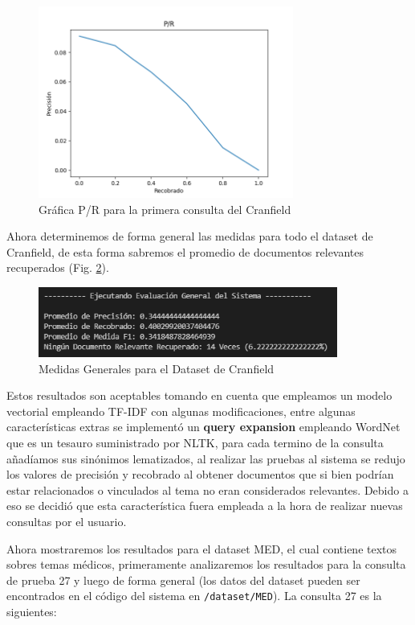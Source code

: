 \documentclass[runningheads,a4paper]{llncs}
\begin{document}
\begin{figure}
	\centering
	\includegraphics[height=6.3cm]{imgs/pr_query1_cran.png}
	\caption{Gráfica P/R para la primera consulta del Cranfield}
	\label{fig:cran1img}
\end{figure}

Ahora determinemos de forma general las medidas para todo el dataset de Cranfield, de esta forma sabremos el promedio de documentos relevantes recuperados (Fig. \ref{fig:cran1gen}).

\begin{figure}
	\centering
	\includegraphics[height=2.3cm]{imgs/eval_general_cran.png}
	\caption{Medidas Generales para el Dataset de Cranfield}
	\label{fig:cran1gen}
\end{figure}

Estos resultados son aceptables tomando en cuenta que empleamos un modelo vectorial empleando TF-IDF con algunas modificaciones, entre algunas características extras se implementó un \textbf{query expansion} empleando WordNet que es un tesauro suministrado por NLTK, para cada termino de la consulta añadíamos sus sinónimos lematizados, al realizar las pruebas al sistema se redujo los valores de precisión y recobrado al obtener documentos que si bien podrían estar relacionados o vinculados al tema no eran considerados relevantes. Debido a eso se decidió que esta característica fuera empleada a la hora de realizar nuevas consultas por el usuario.

Ahora mostraremos los resultados para el dataset MED, el cual contiene textos sobres temas médicos, primeramente analizaremos los resultados para la consulta de prueba 27 y luego de forma general (los datos del dataset pueden ser encontrados en el código del sistema en \verb*|/dataset/MED|). La consulta 27 es la siguientes:
\end{document}
